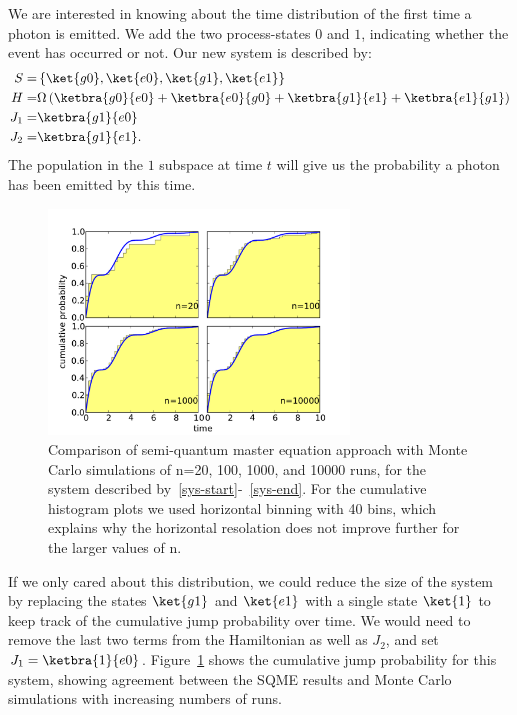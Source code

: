 We are interested in knowing about the time distribution of the first time a photon is emitted. We add the two process-states $0$ and $1$, indicating whether the event has occurred or not. Our new system is described by:
\begin{eqnarray}
  S =& \left\{ \ket{g0}, \ket{e0}, \ket{g1}, \ket{e1} \right\} \label{sys-start} \\
  H =& \Omega \left( \ketbra{g0}{e0} + \ketbra{e0}{g0} + \ketbra{g1}{e1} + \ketbra{e1}{g1}  \right) \\
  J_1 =&  \ketbra{g1}{e0} \\
  J_2 =& \ketbra{g1}{e1}. \label{sys-end}
\end{eqnarray}
The population in the $1$ subspace at time $t$ will give us the probability a photon has been emitted by this time.

\begin{figure}[htb]
  \begin{center}
  \includegraphics[width=8cm]{assets/sqme_mc_comp.pdf}
  \end{center}
  \caption{Comparison of semi-quantum master equation approach with Monte Carlo simulations of n=20, 100, 1000, and 10000 runs, for the system described by~\ref{sys-start}-~\ref{sys-end}. For the cumulative histogram plots we used horizontal binning with 40 bins, which explains why the horizontal resolation does not improve further for the larger values of n.}
  \label{sqme_mc_comp}
\end{figure}

If we only cared about this distribution, we could reduce the size of the system by replacing the states $\ket{g1}$ and $\ket{e1}$ with a single state $\ket{1}$ to keep track of the cumulative jump probability over time. We would need to remove the last two terms from the Hamiltonian as well as $J_2$, and set $J_1 =  \ketbra{1}{e0}$. Figure~\ref{sqme_mc_comp} shows the cumulative jump probability for this system, showing agreement between the SQME results and Monte Carlo simulations with increasing numbers of runs.

